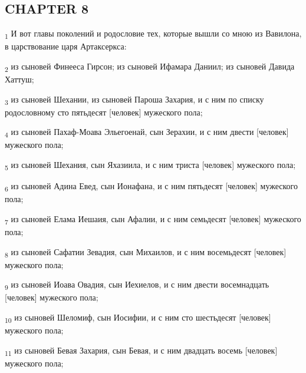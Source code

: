 \subsection{CHAPTER 8}
\begin{tcolorbox}
\textsubscript{1} И вот главы поколений и родословие тех, которые вышли со мною из Вавилона, в царствование царя Артаксеркса:
\end{tcolorbox}
\begin{tcolorbox}
\textsubscript{2} из сыновей Финееса Гирсон; из сыновей Ифамара Даниил; из сыновей Давида Хаттуш;
\end{tcolorbox}
\begin{tcolorbox}
\textsubscript{3} из сыновей Шехании, из сыновей Пароша Захария, и с ним по списку родословному сто пятьдесят [человек] мужеского пола;
\end{tcolorbox}
\begin{tcolorbox}
\textsubscript{4} из сыновей Пахаф-Моава Эльегоенай, сын Зерахии, и с ним двести [человек] мужеского пола;
\end{tcolorbox}
\begin{tcolorbox}
\textsubscript{5} из сыновей Шехания, сын Яхазиила, и с ним триста [человек] мужеского пола;
\end{tcolorbox}
\begin{tcolorbox}
\textsubscript{6} из сыновей Адина Евед, сын Ионафана, и с ним пятьдесят [человек] мужеского пола;
\end{tcolorbox}
\begin{tcolorbox}
\textsubscript{7} из сыновей Елама Иешаия, сын Афалии, и с ним семьдесят [человек] мужеского пола;
\end{tcolorbox}
\begin{tcolorbox}
\textsubscript{8} из сыновей Сафатии Зевадия, сын Михаилов, и с ним восемьдесят [человек] мужеского пола;
\end{tcolorbox}
\begin{tcolorbox}
\textsubscript{9} из сыновей Иоава Овадия, сын Иехиелов, и с ним двести восемнадцать [человек] мужеского пола;
\end{tcolorbox}
\begin{tcolorbox}
\textsubscript{10} из сыновей Шеломиф, сын Иосифии, и с ним сто шестьдесят [человек] мужеского пола;
\end{tcolorbox}
\begin{tcolorbox}
\textsubscript{11} из сыновей Бевая Захария, сын Бевая, и с ним двадцать восемь [человек] мужеского пола;
\end{tcolorbox}
